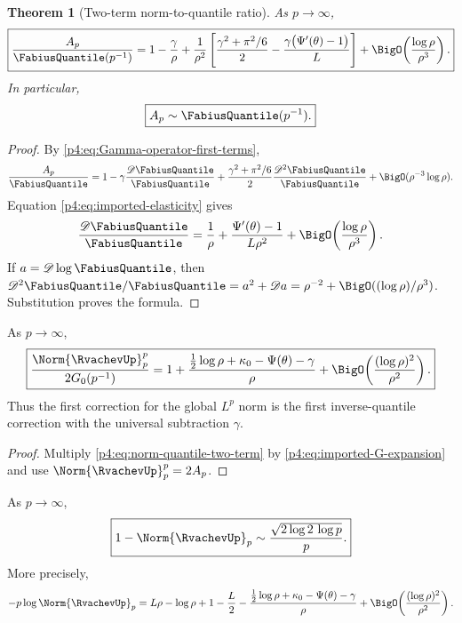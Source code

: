 \documentclass[11pt,oneside]{article}
\newtheorem{theorem}{Theorem}[section]
\theoremstyle{definition}
\theoremstyle{remark}
\begin{document}
\begin{theorem}[Two-term norm-to-quantile ratio]
\label{p4:thm:norm-quantile-ratio}
As $p\to\infty$,
\begin{equation}
 \boxed{
 \frac{A_p}{\FabiusQuantile(p^{-1})}
 =1-\frac{\gamma}{\rho}
 +\frac{1}{\rho^2}
 \left[
 \frac{\gamma^2+\pi^2/6}{2}
 -\frac{\gamma\bigl(\Psi'(\theta)-1\bigr)}{L}
 \right]
 +\BigO\!\left(\frac{\log\rho}{\rho^3}\right).}
 \label{p4:eq:norm-quantile-two-term}
\end{equation}
In particular,
\begin{equation}
 \boxed{A_p\sim\FabiusQuantile(p^{-1}).}
 \label{p4:eq:Ap-G-equivalent}
\end{equation}
\end{theorem}

\begin{proof}
By \eqref{p4:eq:Gamma-operator-first-terms},
\[
 \frac{A_p}{\FabiusQuantile}
 =1-\gamma\frac{\Dop\FabiusQuantile}{\FabiusQuantile}
 +\frac{\gamma^2+\pi^2/6}{2}
  \frac{\Dop^2\FabiusQuantile}{\FabiusQuantile}
 +\BigO(\rho^{-3}\log\rho).
\]
Equation \eqref{p4:eq:imported-elasticity} gives
\[
 \frac{\Dop\FabiusQuantile}{\FabiusQuantile}
 =\frac1\rho+\frac{\Psi'(\theta)-1}{L\rho^2}
 +\BigO\!\left(\frac{\log\rho}{\rho^3}\right).
\]
If $a=\Dop\log\FabiusQuantile$, then
$\Dop^2\FabiusQuantile/\FabiusQuantile
=a^2+\Dop a=\rho^{-2}+\BigO((\log\rho)/\rho^3)$.
Substitution proves the formula.
\end{proof}

\begin{corollary}
\label{p4:cor:Euler-shift}
As $p\to\infty$,
\begin{equation}
 \boxed{
 \frac{\Norm{\RvachevUp}_p^p}{2G_0(p^{-1})}
 =1+\frac{\frac12\log\rho+\kappa_0-\Psi(\theta)-\gamma}{\rho}
 +\BigO\!\left(\frac{(\log\rho)^2}{\rho^2}\right).}
 \label{p4:eq:Euler-shift}
\end{equation}
Thus the first correction for the global $L^p$ norm is the first inverse-quantile correction
with the universal subtraction $\gamma$.
\end{corollary}

\begin{proof}
Multiply \eqref{p4:eq:norm-quantile-two-term} by
\eqref{p4:eq:imported-G-expansion} and use $\Norm{\RvachevUp}_p^p=2A_p$.
\end{proof}

\begin{corollary}
\label{p4:cor:norm-deficit}
As $p\to\infty$,
\begin{equation}
 \boxed{
 1-\Norm{\RvachevUp}_p
 \sim\frac{\sqrt{2\log2\,\log p}}{p}.}
 \label{p4:eq:norm-deficit}
\end{equation}
More precisely,
\begin{equation}
 -p\log\Norm{\RvachevUp}_p
 =L\rho-\log\rho+1-\frac L2
 -\frac{\frac12\log\rho+\kappa_0-\Psi(\theta)-\gamma}{\rho}
 +\BigO\!\left(\frac{(\log\rho)^2}{\rho^2}\right).
 \label{p4:eq:log-norm-refined}
\end{equation}
\end{corollary}
\end{document}

